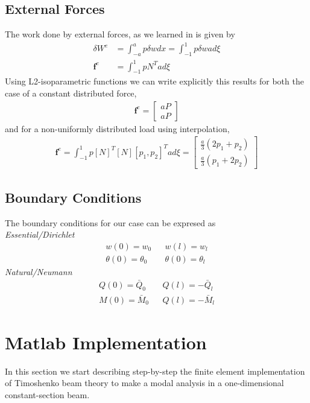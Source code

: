 \documentclass[10pt,twoside,a4paper]{article}
\renewcommand{\vec}[1]{\mathbf{#1}}
\begin{document}
\subsection{External Forces}
The work done by external forces, as we learned in \cite{Chen2013} is given by
\begin{align}
  \delta W^e &= \int_{-a}^{a} p \delta wdx = \int_{-1}^{1} p \delta w a d\xi \\
  \vec{f}^e &= \int_{-1}^{1} p N^T a d\xi
\end{align}
Using L2-isoparametric functions we can write explicitly this results for both the case of a constant distributed force,
\begin{align}
\vec{f}^e = 
 \begin{bmatrix}
  a P \\
  a P
 \end{bmatrix}
\end{align}
and for a non-uniformly distributed load using interpolation,
\begin{align}
\vec{f}^e = \int_{-1}^{1} p [N]^T [N] [p_1,p_2]^T a d\xi = 
 \begin{bmatrix}
  \frac{a}{3} (2p_1+p_2) \\
  \frac{a}{3} (p_1+2p_2)
 \end{bmatrix}
\end{align}


\subsection{Boundary Conditions}
The boundary conditions for our case can be expresed as \\
\emph{Essential/Dirichlet}
\begin{align*}
	&w(0)=w_0&  &w(l)=w_l& \\
	&\theta(0)=\theta_0 & &\theta(0)=\theta_l &
\end{align*}
\emph{Natural/Neumann}
\begin{align*}
	&Q(0)=\bar{Q}_0& &Q(l)=-\bar{Q}_l & \\
	&M(0)=\bar{M}_0& &Q(l)=-\bar{M}_l &
\end{align*}

\section{Matlab Implementation}
In this section we start describing step-by-step the finite element implementation of Timoshenko beam theory to make a modal analysis in a one-dimensional constant-section beam.
\end{document}
